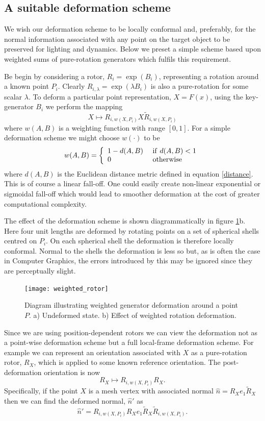 \subsection{A suitable deformation scheme}

We wish our deformation scheme to be locally conformal and, preferably, for the
normal information associated with any point on the target object to be preserved
for lighting and dynamics. Below we preset a simple scheme based upon weighted sums
of pure-rotation generators which fulfils this requirement.

Be begin by considering a rotor, $R_i = \exp(B_i)$, representing a rotation around a 
known point $P_i$. Clearly $R_{i,\lambda} = \exp(\lambda B_i)$ is also a pure-rotation
for some scalar $\lambda$. To deform a particular
point representation, $X = F(x)$, using the key-generator $B_i$ we perform the mapping
\[
X \mapsto R_{i,w(X,P_i)}X\tilde{R}_{i,w(X,P_i)}
\]
where $w(A,B)$ is a weighting function with range $[0,1]$. For a simple deformation
scheme we might choose $w(\cdot)$ to be
\[
w(A,B) = \left\{
  \begin{array}{ll}
  1 - d(A,B) &{\rm ~if~} d(A,B) < 1\\
          0 & {\rm ~otherwise}
  \end{array}
  \right.
\]
where $d(A,B)$ is the Euclidean distance metric defined in equation \ref{distance}.
This is of course a linear fall-off. One could easily create non-linear exponential
or sigmoidal fall-off which would lead to smoother deformation at the cost of greater
computational complexity.

The effect of the deformation scheme is shown diagrammatically in figure
\ref{fig:weighted_rotor}b. Here four unit lengths are deformed by rotating points
on a set of spherical shells centred on $P_i$. On each spherical shell the deformation
is therefore locally conformal. Normal to the shells the deformation is less so but,
as is often the case in Computer Graphics, the errors introduced by this
may be ignored since they are perceptually slight.

\begin{figure}
\centering
\texttt{[image: weighted\_rotor]}
\caption{\label{fig:weighted_rotor}%
  Diagram illustrating weighted generator deformation around a point $P$. 
          a) Undeformed state. b) Effect of weighted rotation deformation.
}
\end{figure}

Since we are using position-dependent rotors we can view the deformation not as a point-wise 
deformation scheme but a full local-frame deformation scheme. For example we can represent an
orientation associated with $X$ as a pure-rotation rotor, $R_X$, which is applied to some known
reference orientation. The post-deformation orientation is now
\[
R_X \mapsto R_{i,w(X,P_i)}R_X.
\]
Specifically, if the point $X$ is a mesh vertex with associated normal
$\hat{n} = R_Xe_1\tilde{R}_X$ then we can find the deformed normal, $\hat{n}'$ as
\[
\hat{n}' = R_{i,w(X,P_i)}R_Xe_1\tilde{R}_X\tilde{R}_{i,w(X,P_i)}.
\]

